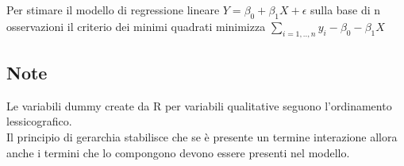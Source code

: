 Per stimare il modello di regressione lineare $Y = \beta_0 + \beta_1X + \epsilon$ sulla
base di n osservazioni il criterio dei minimi quadrati minimizza $\sum_{i=1,..,n} y_i - \beta_0 - \beta_1X$

\subsection{Note}

Le variabili dummy create da R per variabili qualitative seguono l'ordinamento lessicografico.\\

Il principio di gerarchia stabilisce che se è presente un termine interazione allora anche i termini
che lo compongono devono essere presenti nel modello.
